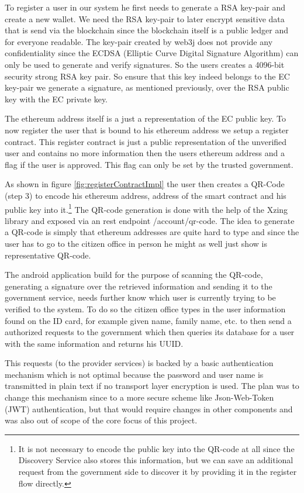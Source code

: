 To register a user in our system he first needs to generate a RSA key-pair and create a new wallet. We need the RSA key-pair to later encrypt sensitive data that is send via the blockchain since the blockchain itself is a public ledger and for everyone readable. The key-pair created by web3j does not provide any confidentiality since the ECDSA (Elliptic Curve Digital Signature Algorithm) can only be used to generate and verify signatures. So the users creates a 4096-bit security strong RSA key pair. So ensure that this key indeed belongs to the EC key-pair we generate a signature, as mentioned previously, over the RSA public key with the EC private key. 

The ethereum address itself is a just a representation of the EC public key. To now register the user that is bound to his ethereum address we setup a register contract. This register contract is just a public representation of the unverified user and contains no more information then the users ethereum address and a flag if the user is approved. This flag can only be set by the trusted government. 

As shown in figure \ref{fig:registerContractImpl} the user then creates a QR-Code (step 3) to encode his ethereum address, address of the smart contract and his public key into it.\footnote{It is not necessary to encode the public key into the QR-code at all since the Discovery Service also stores this information, but we can save an additional request from the government side to discover it by providing it in the register flow directly.} The QR-code generation is done with the help of the Xzing library and exposed via an rest endpoint /account/qr-code. The idea to generate a QR-code is simply that ethereum addresses are quite hard to type and since the user has to go to the citizen office in person he might as well just show is representative QR-code. 

The android application build for the purpose of scanning the QR-code, generating a signature over the retrieved information and sending it to the government service, needs further know which user is currently trying to be verified to the system. To do so the citizen office types in the user information found on the ID card, for example given name, family name, etc. to then send a authorized requests to the government which then queries its database for a user with the same information and returns his UUID. 

This requests (to the provider services) is backed by a basic authentication mechanism which is not optimal because the password and user name is transmitted in plain text if no transport layer encryption is used. The plan was to change this mechanism since to a more secure scheme like Json-Web-Token (JWT) authentication, but that would require changes in other components and was also out of scope of the core focus of this project. 

